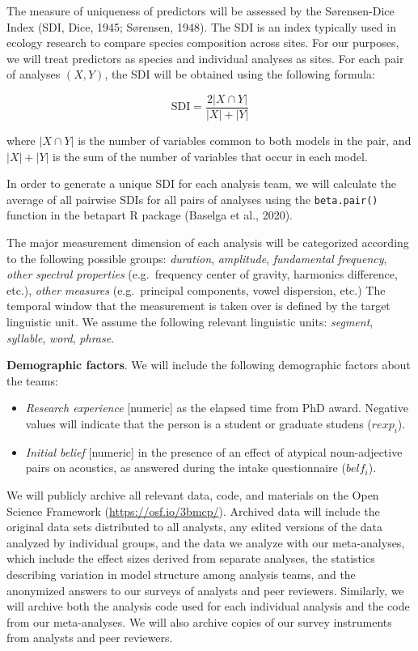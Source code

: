 \documentclass[
  english,
  man,floatsintext]{apa6}
\providecommand{\tightlist}{%
  \setlength{\itemsep}{0pt}\setlength{\parskip}{0pt}}
\begin{document}
The measure of uniqueness of predictors will be assessed by the Sørensen-Dice Index (SDI, Dice, 1945; Sørensen, 1948).
The SDI is an index typically used in ecology research to compare species composition across sites.
For our purposes, we will treat predictors as species and individual analyses as sites.
For each pair of analyses \((X, Y)\), the SDI will be obtained using the following formula:

\[\text{SDI} = \frac{2|X \cap Y|}{|X|+|Y|}\]

where \(|X \cap Y|\) is the number of variables common to both models in the pair, and \(|X|+|Y|\) is the sum of the number of variables that occur in each model.

In order to generate a unique SDI for each analysis team, we will calculate the average of all pairwise SDIs for all pairs of analyses using the \texttt{beta.pair()} function in the betapart R package (Baselga et al., 2020).

The major measurement dimension of each analysis will be categorized according to the following possible groups: \emph{duration}, \emph{amplitude}, \emph{fundamental frequency}, \emph{other spectral properties} (e.g.~frequency center of gravity, harmonics difference, etc.), \emph{other measures} (e.g.~principal components, vowel dispersion, etc.)
The temporal window that the measurement is taken over is defined by the target linguistic unit.
We assume the following relevant linguistic units: \emph{segment}, \emph{syllable}, \emph{word}, \emph{phrase}.

\textbf{Demographic factors}. We will include the following demographic factors about the teams:

\begin{itemize}
\tightlist
\item
  \emph{Research experience} {[}numeric{]} as the elapsed time from PhD award. Negative values will indicate that the person is a student or graduate studens (\(rexp_i\)).
\item
  \emph{Initial belief} {[}numeric{]} in the presence of an effect of atypical noun-adjective pairs on acoustics, as answered during the intake questionnaire (\(belf_i\)).
\end{itemize}

We will publicly archive all relevant data, code, and materials on the Open Science Framework (\url{https://osf.io/3bmcp/}).
Archived data will include the original data sets distributed to all analysts, any edited versions of the data analyzed by individual groups, and the data we analyze with our meta-analyses, which include the effect sizes derived from separate analyses, the statistics describing variation in model structure among analysis teams, and the anonymized answers to our surveys of analysts and peer reviewers.
Similarly, we will archive both the analysis code used for each individual analysis and the code from our meta-analyses.
We will also archive copies of our survey instruments from analysts and peer reviewers.
\end{document}
